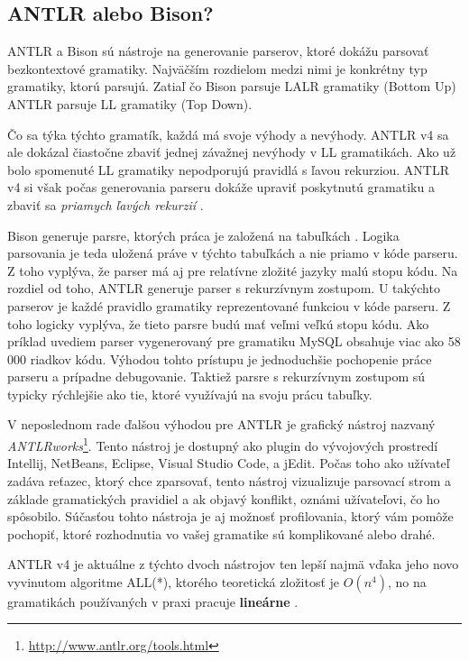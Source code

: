 \subsection{ANTLR alebo Bison?}
ANTLR a Bison sú nástroje na generovanie parserov, ktoré dokážu parsovať bezkontextové gramatiky. Najväčším rozdielom medzi nimi je konkrétny typ gramatiky, ktorú parsujú. Zatiaľ čo Bison parsuje LALR gramatiky (Bottom Up) ANTLR parsuje LL gramatiky (Top Down). 

Čo sa týka týchto gramatík, každá má svoje výhody a nevýhody. ANTLR v4 sa ale dokázal čiastočne zbaviť jednej závažnej nevýhody v LL gramatikách. Ako už bolo spomenuté LL gramatiky nepodporujú pravidlá s ľavou rekurziou. ANTLR v4 si však počas generovania parseru dokáže upraviť poskytnutú gramatiku a zbaviť sa \textit{priamych ľavých rekurzií} \cite{ALL}.

Bison generuje parsre, ktorých práca je založená na tabuľkách \cite{IELR}. Logika parsovania je teda uložená práve v týchto tabuľkách a nie priamo v kóde parseru. Z toho vyplýva, že parser má aj pre relatívne zložité jazyky malú stopu kódu. Na rozdiel od toho, ANTLR generuje parser s rekurzívnym zostupom. U takýchto parserov je každé pravidlo gramatiky reprezentované funkciou v kóde parseru. Z toho logicky vyplýva, že tieto parsre budú mať veľmi veľkú stopu kódu. Ako príklad uvediem parser vygenerovaný pre gramatiku MySQL obsahuje viac ako 58 000 riadkov kódu. Výhodou tohto prístupu je jednoduchšie pochopenie práce parseru a prípadne debugovanie. Taktiež parsre s rekurzívnym zostupom sú typicky rýchlejšie ako tie, ktoré využívajú na svoju prácu tabuľky. 

V neposlednom rade ďalšou výhodou pre ANTLR je grafický nástroj nazvaný \textit{ANTLRworks}\footnote{\url{http://www.antlr.org/tools.html}}. Tento nástroj je dostupný ako plugin do vývojových prostredí Intellij, NetBeans, Eclipse, Visual Studio Code, a jEdit. Počas toho ako užívateľ zadáva reťazec, ktorý chce zparsovať, tento nástroj vizualizuje parsovací strom a základe gramatických pravidiel a ak objavý konflikt, oznámi užívateľovi, čo ho spôsobilo. Súčasťou tohto nástroja je aj možnosť profilovania, ktorý vám pomôže pochopiť, ktoré rozhodnutia vo vašej gramatike sú komplikované alebo drahé.

ANTLR v4 je aktuálne z týchto dvoch nástrojov ten lepší najmä vďaka jeho novo vyvinutom algoritme ALL(*), ktorého teoretická zložitosť je $O(n^4)$, no na gramatikách používaných v praxi pracuje \textbf{lineárne} \cite{ALL}.

